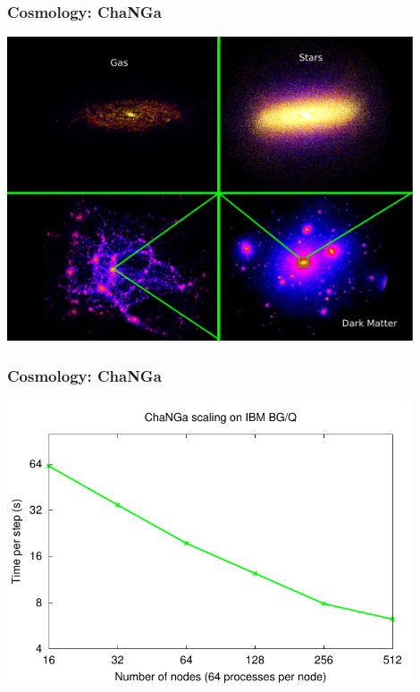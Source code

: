 \begin{frame}
\frametitle{Cosmology: ChaNGa}
\includegraphics[width=0.9\textwidth]{../figures/changa-length-scales.pdf}
\end{frame}


\begin{frame}
\frametitle{Cosmology: ChaNGa}
\includegraphics[width=0.9\textwidth]{../figures/changa-scaling.pdf}
\end{frame}



